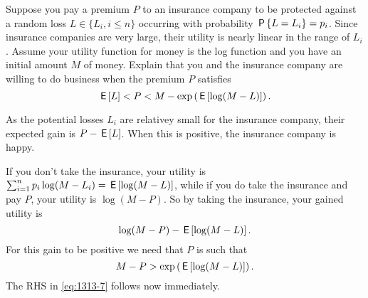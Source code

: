 \begin{exercise}
Suppose you pay a premium $P$ to an insurance company to be protected against a random loss $L \in \{L_{i}, i \leq n\}$ occurring with probability $\P{L = L_{i}} = p_{i}$.
Since insurance companies are very large, their utility is nearly linear in the range of $L_{i}$.
Assume your utility function for money is the log function and you have an initial amount $M$ of money.
Explain that you and the insurance company are willing to do business when the premium $P$ satisfies
\begin{equation}
  \label{eq:1313-7}
\E L < P <   M - \exp\left(\E{\log (M-L)}\right).
\end{equation}
\begin{solution}

As the potential losses $L_{i}$ are relativey small for  the insurance company, their expected gain is $P-\E L$. When this is positive, the insurance company is happy.

If you don't take the insurance, your utility is  $\sum_{i=1}^{n} p_{i} \log (M-L_{i}) = \E{\log(M-L)}$, while if you do take the insurance and pay $P$, your utility is $\log(M-P)$. So by taking the insurance, your gained utility is
\begin{equation}
  \label{eq:138}
\log(M-P) - \E{\log(M-L)}.
\end{equation}
For this gain to be  positive we need that $P$ is such that
\begin{equation}
  \label{eq:139}
M-P > \exp\left(\E{\log(M-L)}\right).
\end{equation}
The RHS in \cref{eq:1313-7} follows now immediately.
\end{solution}
\end{exercise}


